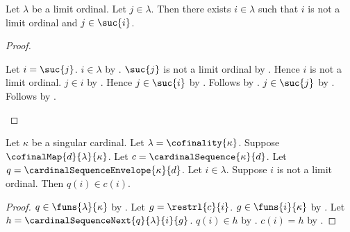 \begin{lemma}\label{nonlimit_index_above}
    Let $\lambda$ be a limit ordinal.
    Let $j\in\lambda$.
    Then there exists $i\in\lambda$ such that
        $i$ is not a limit ordinal and $j\in\suc{i}$.
\end{lemma}
\begin{proof}
    \begin{byCase}
            Let $i=\suc{j}$.
            $i\in\lambda$ by .
            $\suc{j}$ is not a limit ordinal
                by .
            Hence $i$ is not a limit ordinal.
            $j\in i$ by .
            Hence $j\in\suc{i}$ by .
            Follows by \auto.
            $j\in\suc{j}$ by .
            Follows by \auto.
    \end{byCase}
\end{proof}

\begin{proposition}\label{cardinal_sequence_dominates_envelope_at_nonlimit}
    Let $\kappa$ be a singular cardinal.
    Let $\lambda=\cofinality{\kappa}$.
    Suppose $\cofinalMap{d}{\lambda}{\kappa}$.
    Let $c=\cardinalSequence{\kappa}{d}$.
    Let $q=\cardinalSequenceEnvelope{\kappa}{d}$.
    Let $i\in\lambda$.
    Suppose $i$ is not a limit ordinal.
    Then $q(i)\in c(i)$.
\end{proposition}
\begin{proof}
    $q\in\funs{\lambda}{\kappa}$
        by .
    Let $g=\restrl{c}{i}$.
    $g\in\funs{i}{\kappa}$
        by .
    Let $h=\cardinalSequenceNext{q}{\lambda}{i}{g}$.
    $q(i)\in h$ by .
    $c(i)=h$ by .
\end{proof}

